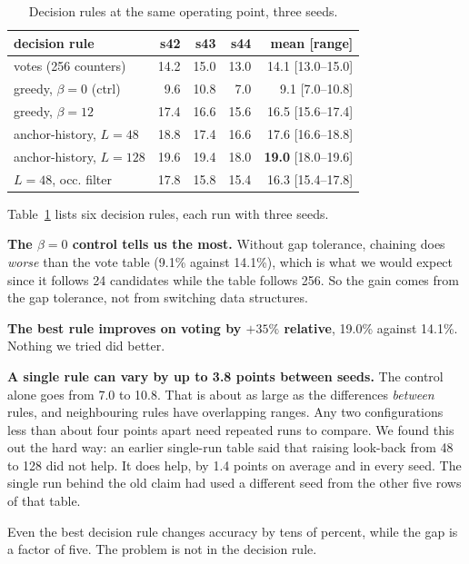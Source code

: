 \documentclass[conference]{IEEEtran}
\begin{document}
\begin{table}[t]
\caption{Decision rules at the same operating point, three seeds.}
\label{tab:rules}
\centering
\scriptsize
\begin{tabular}{lrrrr}
\toprule
decision rule & s42 & s43 & s44 & mean [range] \\
\midrule
votes (256 counters)        & 14.2 & 15.0 & 13.0 & 14.1 [13.0--15.0] \\
greedy, $\beta = 0$ (ctrl)  & 9.6 & 10.8 & 7.0 & 9.1 [7.0--10.8] \\
greedy, $\beta = 12$        & 17.4 & 16.6 & 15.6 & 16.5 [15.6--17.4] \\
anchor-history, $L = 48$    & 18.8 & 17.4 & 16.6 & 17.6 [16.6--18.8] \\
anchor-history, $L = 128$   & 19.6 & 19.4 & 18.0 & \textbf{19.0} [18.0--19.6] \\
\quad $L = 48$, occ. filter & 17.8 & 15.8 & 15.4 & 16.3 [15.4--17.8] \\
\bottomrule
\end{tabular}
\end{table}

Table~\ref{tab:rules} lists six decision rules, each run with three seeds.

\textbf{The $\beta = 0$ control tells us the most.} Without gap tolerance, chaining does
\emph{worse} than the vote table (9.1\% against 14.1\%), which is what we would expect since it
follows 24 candidates while the table follows 256. So the gain comes from the gap tolerance, not
from switching data structures.

\textbf{The best rule improves on voting by $+35\%$ relative}, 19.0\% against 14.1\%. Nothing we
tried did better.

\textbf{A single rule can vary by up to 3.8 points between seeds.} The control alone goes from
7.0 to 10.8. That is about as large as the differences \emph{between} rules, and neighbouring
rules have overlapping ranges. Any two configurations less than about four points apart need
repeated runs to compare. We found this out the hard way: an earlier single-run table said that
raising look-back from 48 to 128 did not help. It does help, by 1.4 points on average and in
every seed. The single run behind the old claim had used a different seed from the other five
rows of that table.

Even the best decision rule changes accuracy by tens of percent, while the gap is a factor of
five. The problem is not in the decision rule.
\end{document}
